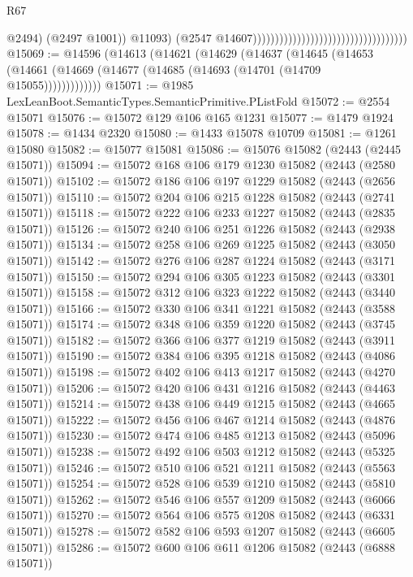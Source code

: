 \begin{lexlean}{R67}
\begin{coremodule}
                                                                              @2494)
                                                                            (@2497 @1001))
                                                                          @11093)
                                                                        (@2547
                                                                          @14607)))))))))))))))))))))))))))))))))))
@15069 := @14596
    (@14613
      (@14621
        (@14629
          (@14637
            (@14645
              (@14653 (@14661 (@14669 (@14677 (@14685 (@14693 (@14701 (@14709 @15055)))))))))))))
@15071 := @1985 LexLeanBoot.SemanticTypes.SemanticPrimitive.PListFold
@15072 := @2554 @15071
@15076 := @15072 @129 @106 @165 @1231
@15077 := @1479 @1924
@15078 := @1434 @2320
@15080 := @1433 @15078 @10709
@15081 := @1261 @15080
@15082 := @15077 @15081
@15086 := @15076 @15082 (@2443 (@2445 @15071))
@15094 := @15072 @168 @106 @179 @1230 @15082 (@2443 (@2580 @15071))
@15102 := @15072 @186 @106 @197 @1229 @15082 (@2443 (@2656 @15071))
@15110 := @15072 @204 @106 @215 @1228 @15082 (@2443 (@2741 @15071))
@15118 := @15072 @222 @106 @233 @1227 @15082 (@2443 (@2835 @15071))
@15126 := @15072 @240 @106 @251 @1226 @15082 (@2443 (@2938 @15071))
@15134 := @15072 @258 @106 @269 @1225 @15082 (@2443 (@3050 @15071))
@15142 := @15072 @276 @106 @287 @1224 @15082 (@2443 (@3171 @15071))
@15150 := @15072 @294 @106 @305 @1223 @15082 (@2443 (@3301 @15071))
@15158 := @15072 @312 @106 @323 @1222 @15082 (@2443 (@3440 @15071))
@15166 := @15072 @330 @106 @341 @1221 @15082 (@2443 (@3588 @15071))
@15174 := @15072 @348 @106 @359 @1220 @15082 (@2443 (@3745 @15071))
@15182 := @15072 @366 @106 @377 @1219 @15082 (@2443 (@3911 @15071))
@15190 := @15072 @384 @106 @395 @1218 @15082 (@2443 (@4086 @15071))
@15198 := @15072 @402 @106 @413 @1217 @15082 (@2443 (@4270 @15071))
@15206 := @15072 @420 @106 @431 @1216 @15082 (@2443 (@4463 @15071))
@15214 := @15072 @438 @106 @449 @1215 @15082 (@2443 (@4665 @15071))
@15222 := @15072 @456 @106 @467 @1214 @15082 (@2443 (@4876 @15071))
@15230 := @15072 @474 @106 @485 @1213 @15082 (@2443 (@5096 @15071))
@15238 := @15072 @492 @106 @503 @1212 @15082 (@2443 (@5325 @15071))
@15246 := @15072 @510 @106 @521 @1211 @15082 (@2443 (@5563 @15071))
@15254 := @15072 @528 @106 @539 @1210 @15082 (@2443 (@5810 @15071))
@15262 := @15072 @546 @106 @557 @1209 @15082 (@2443 (@6066 @15071))
@15270 := @15072 @564 @106 @575 @1208 @15082 (@2443 (@6331 @15071))
@15278 := @15072 @582 @106 @593 @1207 @15082 (@2443 (@6605 @15071))
@15286 := @15072 @600 @106 @611 @1206 @15082 (@2443 (@6888 @15071))

\end{coremodule}
\end{lexlean}
